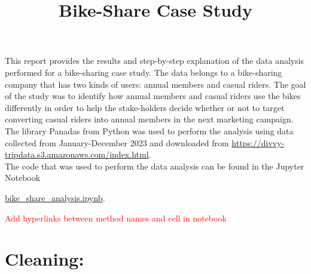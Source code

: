 \documentclass[12pt]{article}
\begin{document}
\title{Bike-Share Case Study}
\date{}
\maketitle

This report provides the results and step-by-step explanation of the data analysis performed for a bike-sharing case study. The data belongs to a bike-sharing company that has two kinds of users: annual members and casual riders. The goal of the study was to identify how annual members and casual riders use the bikes differently in order to help the stake-holders decide whether or not to target converting casual riders into annual members in the next marketing campaign. The library Panadas from Python was used to perform the analysis using data collected from January-December 2023 and downloaded from \url{https://divvy-tripdata.s3.amazonaws.com/index.html}. \\

The code that was used to perform the data analysis can be found in the Jupyter Notebook 

\href{https://github.com/SummerKassem/BikeShareCS/blob/main/Code/bike_share_analysis.ipynb}{bike\_share\_analysis.ipynb}.

\textcolor{red}{Add hyperlinks between method names and cell in notebook}


\section*{Cleaning:}
\end{document}
